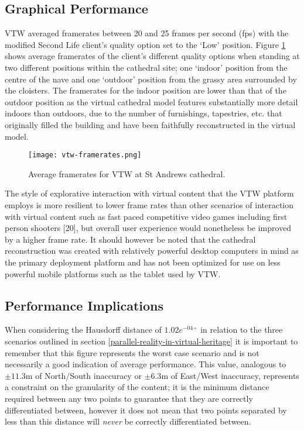 
\subsection{Graphical Performance}

VTW averaged framerates between 20 and 25 frames per second (fps) with the modified Second Life client's quality option set to the `Low' position. Figure \ref{vtw-framerates.png} shows average framerates of the client's different quality options when standing at two different positions within the cathedral site; one `indoor' position from the centre of the nave and one `outdoor' position from the grassy area surrounded by the cloisters. The framerates for the indoor position are lower than that of the outdoor position as the virtual cathedral model features substantially more detail indoors than outdoors, due to the number of furnishings, tapestries, etc. that originally filled the building and have been faithfully reconstructed in the virtual model.

\begin{figure}[h]
	\centering
	\texttt{[image: vtw-framerates.png]}
	\caption{Average framerates for VTW at St Andrews cathedral.}
	\label{vtw-framerates.png}
\end{figure}

The style of explorative interaction with virtual content that the VTW platform employs is more resilient to lower frame rates than other scenarios of interaction with virtual content such as fast paced competitive video games including first person shooters [20], but overall user experience would nonetheless be improved by a higher frame rate. It should however be noted that the cathedral reconstruction was created with relatively powerful desktop computers in mind as the primary deployment platform and has not been optimized for use on less powerful mobile platforms such as the tablet used by VTW.


\subsection{Performance Implications}

When considering the Hausdorff distance of $1.02e^{-04\circ}$ in relation to the three scenarios outlined in section \ref{parallel-reality-in-virtual-heritage} it is important to remember that this figure represents the worst case scenario and is not necessarily a good indication of average performance. This value, analogous to $\pm11.3$m of North/South inaccuracy or $\pm6.3$m of East/West inaccuracy, represents a constraint on the granularity of the content; it is the minimum distance required between any two points to guarantee that they are correctly differentiated between, however it does not mean that two points separated by less than this distance will \textit{never} be correctly differentiated between.

